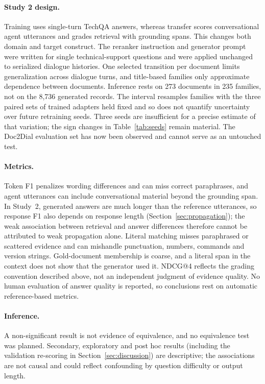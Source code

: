 \paragraph{Study 2 design.} Training uses single-turn TechQA answers, whereas transfer scores conversational agent utterances and grades retrieval with grounding spans. This changes both domain and target construct. The reranker instruction and generator prompt were written for single technical-support questions and were applied unchanged to serialized dialogue histories. One selected transition per document limits generalization across dialogue turns, and title-based families only approximate dependence between documents. Inference rests on 273 documents in 235 families, not on the 8,736 generated records. The interval resamples families with the three paired sets of trained adapters held fixed and so does not quantify uncertainty over future retraining seeds. Three seeds are insufficient for a precise estimate of that variation; the sign changes in Table~\ref{tab:seeds} remain material. The Doc2Dial evaluation set has now been observed and cannot serve as an untouched test.

\paragraph{Metrics.} Token F1 penalizes wording differences and can miss correct paraphrases, and agent utterances can include conversational material beyond the grounding span. In Study~2, generated answers are much longer than the reference utterances, so response F1 also depends on response length (Section~\ref{sec:propagation}); the weak association between retrieval and answer differences therefore cannot be attributed to weak propagation alone. Literal matching misses paraphrased or scattered evidence and can mishandle punctuation, numbers, commands and version strings. Gold-document membership is coarse, and a literal span in the context does not show that the generator used it. NDCG@4 reflects the grading convention described above, not an independent judgment of evidence quality. No human evaluation of answer quality is reported, so conclusions rest on automatic reference-based metrics.

\paragraph{Inference.} A non-significant result is not evidence of equivalence, and no equivalence test was planned. Secondary, exploratory and post hoc results (including the validation re-scoring in Section~\ref{sec:discussion}) are descriptive; the associations are not causal and could reflect confounding by question difficulty or output length.

